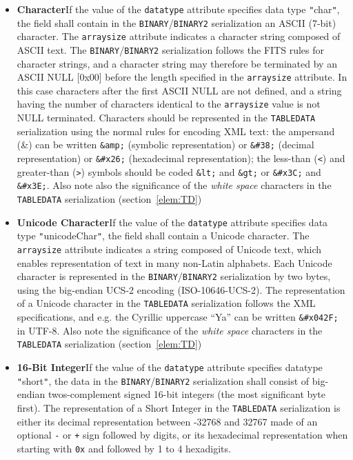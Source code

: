 \documentclass[11pt,a4paper]{ivoa}
\def\Arefs#1{section~\ref{#1}}
\let\fg=\color
\def\attr#1{{\tt{\fg{DarkRed}#1}}}
\def\elem#1{{\tt{\fg{DarkRed}#1}}}
\def\literalvalue#1{{\tt"}{{\fg{DarkPurple}#1}}{\tt"}}
\begin{document}
{\begin{itemize}
\item {\bf Character}\quad If the value of the {\attr{datatype}}
attribute specifies data type {\literalvalue{char}},
the field shall contain in the \elem{BINARY}/\elem{BINARY2} serialization an ASCII
(7-bit) character.
The \attr{arraysize} attribute
indicates a character string composed of ASCII text.
The \elem{BINARY}/\elem{BINARY2} serialization follows the
FITS rules for character strings,
and a character string may therefore be terminated by an ASCII
NULL [0x00]
before the length specified in the \attr{arraysize} attribute.
In this case characters after the first ASCII NULL are not defined,
and a string having the number of characters identical to
the \attr{arraysize} value is not NULL terminated.
Characters should be represented in the \elem{TABLEDATA} serialization
using the normal rules for encoding XML text:
the ampersand (\&) can be written \verb+&amp;+ (symbolic representation)
or \verb+&#38;+ (decimal representation) or
\verb+&#x26;+ (hexadecimal representation); the less-than ({\tt<}) and greater-than ({\tt>}) symbols should be coded \verb+&lt;+ and \verb+&gt;+
or \verb+&#x3C;+ and \verb+&#x3E;+.
Also note also the significance of the {\em white space} characters
in the \elem{TABLEDATA} serialization
(\Arefs{elem:TD})

\item {\bf Unicode Character}\quad If the value of the {\attr{datatype}}
attribute specifies data type {\literalvalue{unicodeChar}},
the field shall contain a Unicode character.
The \attr{arraysize} attribute
indicates a string composed of Unicode text,
which enables representation of text in many non-Latin alphabets.
Each Unicode character is represented in the \elem{BINARY}/\elem{BINARY2} serialization by
two bytes, using the big-endian UCS-2 encoding (ISO-10646-UCS-2).
The representation of a Unicode character in the  \elem{TABLEDATA} serialization
follows the XML specifications,
and e.g. the Cyrillic uppercase ``Ya'' can be written
\verb+&#x042F;+ in UTF-8.
Also note the significance of the {\em white space} characters
in the \elem{TABLEDATA} serialization
(\Arefs{elem:TD})


\item {\bf 16-Bit Integer}\quad If the value of the {\attr{datatype}}
attribute specifies datatype {\literalvalue{short}},
the data in the \elem{BINARY}/\elem{BINARY2} serialization shall consist of
big-endian twos-complement signed 16-bit integers
(the most significant byte first).
The representation of a Short Integer in the \elem{TABLEDATA} serialization
is either its decimal representation between -32768 and 32767
   made of an optional {\tt-} or {\tt+} sign followed by digits,
   or its hexadecimal representation when starting with {\tt0x}
   and followed by 1 to 4 hexadigits.


\end{itemize}}
\end{document}
